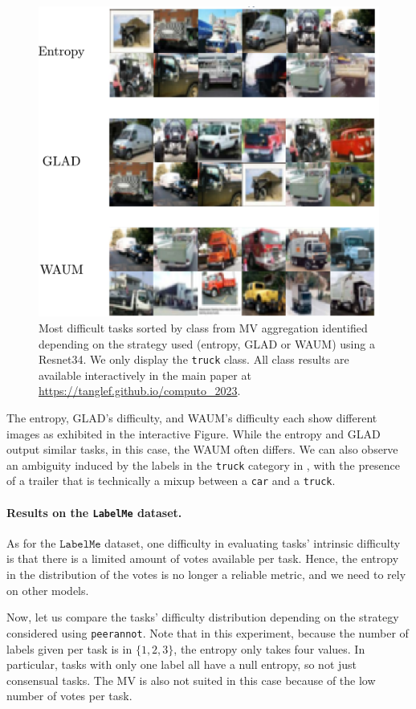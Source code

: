 \begin{figure}[htb]
    \centering
    \includegraphics[width=.8\textwidth]{./images_peerannot/c10h_identification.pdf}
    \caption{Most difficult tasks sorted by class from MV aggregation identified depending on the strategy used (entropy, GLAD or WAUM) using a Resnet34. We only display the \texttt{truck} class. All class results are available interactively in the main paper at \url{https://tanglef.github.io/computo_2023}.}
    \label{fig:identfication_c10h}
\end{figure}

The entropy, GLAD's difficulty, and WAUM's difficulty each show different images as exhibited in the interactive Figure. While the entropy and GLAD output similar tasks, in this case, the WAUM often differs. We can also observe an ambiguity induced by the labels in the \texttt{truck} category in , with the presence of a trailer that is technically a mixup between a \texttt{car} and a \texttt{truck}.

\paragraph{Results on the \texttt{LabelMe} dataset.}

As for the $\texttt{LabelMe}$ dataset, one difficulty in evaluating tasks' intrinsic difficulty is that there is a limited amount of votes available per task.
Hence, the entropy in the distribution of the votes is no longer a reliable metric, and we need to rely on other models.

Now, let us compare the tasks' difficulty distribution depending on the strategy considered using \texttt{peerannot}.
Note that in this experiment, because the number of labels given per task is in $\{1,2,3\}$, the entropy only takes four values.
In particular, tasks with only one label all have a null entropy, so not just consensual tasks.
The MV is also not suited in this case because of the low number of votes per task.

